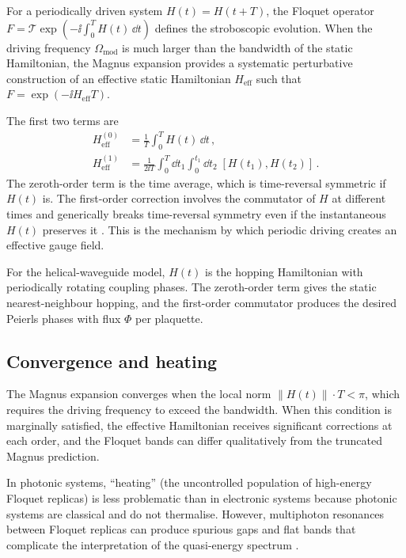 For a periodically driven system $H(t)=H(t+T)$, the Floquet operator
$F=\mathcal{T}\exp(-\ii\int_0^T H(t)\,\dd t)$ defines the
stroboscopic evolution.  When the driving frequency
$\Omega_{\mathrm{mod}}$ is much larger than the bandwidth of the
static Hamiltonian, the Magnus expansion provides a systematic
perturbative construction of an effective static Hamiltonian
$H_{\mathrm{eff}}$ such that $F=\exp(-\ii H_{\mathrm{eff}}T)$.

The first two terms are
\begin{align}
  H_{\mathrm{eff}}^{(0)} &= \frac{1}{T}\int_0^T H(t)\,\dd t\,,
  \label{eq:ch13-magnus-0}\\
  H_{\mathrm{eff}}^{(1)} &= \frac{1}{2\ii T}\int_0^T\!\!\dd t_1
  \int_0^{t_1}\!\!\dd t_2\;[H(t_1),H(t_2)]\,.
  \label{eq:ch13-magnus-1}
\end{align}
The zeroth-order term is the time average, which is time-reversal
symmetric if $H(t)$ is.  The first-order correction involves the
commutator of $H$ at different times and generically breaks
time-reversal symmetry even if the instantaneous $H(t)$ preserves
it \cite{kitagawa2010topological,ozawa2018topological}.  This is the
mechanism by which periodic driving creates an effective gauge field.

For the helical-waveguide model, $H(t)$ is the hopping Hamiltonian
with periodically rotating coupling phases.  The zeroth-order term
gives the static nearest-neighbour hopping, and the first-order
commutator produces the desired Peierls phases with flux $\Phi$ per
plaquette.

\subsection{Convergence and heating}
\label{sec:ch13-convergence}

The Magnus expansion converges when the local norm
$\|H(t)\|\cdot T<\pi$, which requires the driving frequency to exceed
the bandwidth.  When this condition is marginally satisfied, the
effective Hamiltonian receives significant corrections at each order,
and the Floquet bands can differ qualitatively from the truncated
Magnus prediction.

In photonic systems, ``heating'' (the uncontrolled population of
high-energy Floquet replicas) is less problematic than in electronic
systems because photonic systems are classical and do not thermalise.
However, multiphoton resonances between Floquet replicas can produce
spurious gaps and flat bands that complicate the interpretation of
the quasi-energy spectrum \cite{price2022roadmap}.

